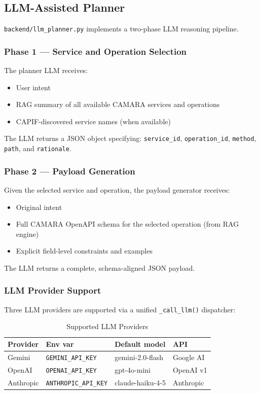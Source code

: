 \documentclass[conference]{IEEEtran}
\begin{document}
\subsection{LLM-Assisted Planner}

\texttt{backend/llm\_planner.py} implements a two-phase LLM reasoning
pipeline.

\subsubsection{Phase 1 — Service and Operation Selection}
The planner LLM receives:
\begin{itemize}[leftmargin=1.2em]
  \item User intent
  \item RAG summary of all available CAMARA services and operations
  \item CAPIF-discovered service names (when available)
\end{itemize}

The LLM returns a JSON object specifying: \texttt{service\_id},
\texttt{operation\_id}, \texttt{method}, \texttt{path}, and
\texttt{rationale}.

\subsubsection{Phase 2 — Payload Generation}
Given the selected service and operation, the payload generator receives:
\begin{itemize}[leftmargin=1.2em]
  \item Original intent
  \item Full CAMARA OpenAPI schema for the selected operation (from RAG engine)
  \item Explicit field-level constraints and examples
\end{itemize}

The LLM returns a complete, schema-aligned JSON payload.

\subsubsection{LLM Provider Support}
Three LLM providers are supported via a unified \texttt{\_call\_llm()}
dispatcher:

\begin{table}[H]
\centering
\caption{Supported LLM Providers}
\label{tab:llm}
\scriptsize
\begin{tabular}{llll}
\toprule
\textbf{Provider} & \textbf{Env var} & \textbf{Default model} & \textbf{API} \\
\midrule
Gemini & \texttt{GEMINI\_API\_KEY} & gemini-2.0-flash & Google AI \\
OpenAI & \texttt{OPENAI\_API\_KEY} & gpt-4o-mini & OpenAI v1 \\
Anthropic & \texttt{ANTHROPIC\_API\_KEY} & claude-haiku-4-5 & Anthropic \\
\bottomrule
\end{tabular}
\end{table}
\end{document}
